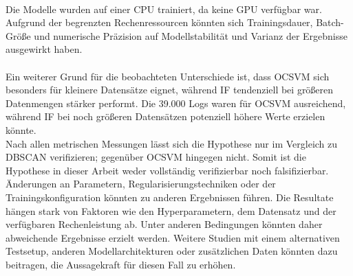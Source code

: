 \documentclass[a4paper,12pt]{article}
\begin{document}
	\\[0.5em]
	Die Modelle wurden auf einer CPU trainiert, da keine GPU verfügbar war. Aufgrund der begrenzten Rechenressourcen könnten sich Trainingsdauer, Batch-Größe und numerische Präzision auf Modellstabilität und Varianz der Ergebnisse ausgewirkt haben.  
	\\[0.5em]
	\\[0.5em]
	Ein weiterer Grund für die beobachteten Unterschiede ist, dass OCSVM sich besonders für kleinere Datensätze eignet, während IF tendenziell bei größeren Datenmengen stärker performt. Die 39.000 Logs waren für OCSVM ausreichend, während IF bei noch größeren Datensätzen potenziell höhere Werte erzielen könnte.
	\\[0.5em]
	Nach allen metrischen Messungen lässt sich die Hypothese nur im Vergleich zu DBSCAN verifizieren; gegenüber OCSVM hingegen nicht. Somit ist die Hypothese in dieser Arbeit weder vollständig verifizierbar noch falsifizierbar. Änderungen an Parametern, Regularisierungstechniken oder der Trainingskonfiguration könnten zu anderen Ergebnissen führen. Die Resultate hängen stark von Faktoren wie den Hyperparametern, dem Datensatz und der verfügbaren Rechenleistung ab. Unter anderen Bedingungen könnten daher abweichende Ergebnisse erzielt werden. Weitere Studien mit einem alternativen Testsetup, anderen Modellarchitekturen oder zusätzlichen Daten könnten dazu beitragen, die Aussagekraft für diesen Fall zu erhöhen.
	
\end{document}

